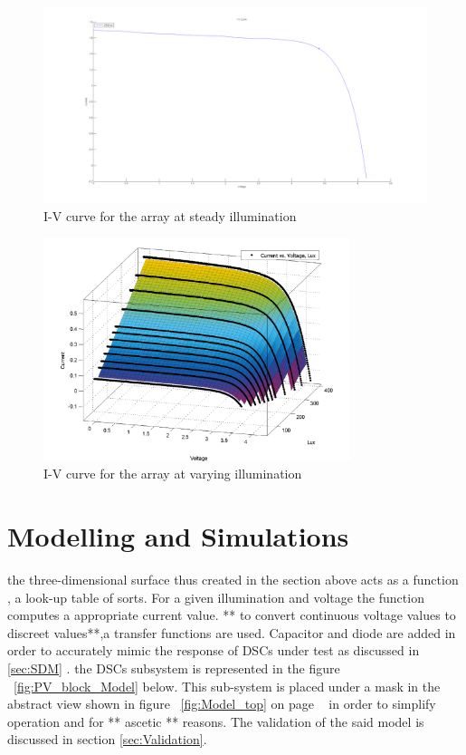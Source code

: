   \begin{figure}[H]
	  \begin{center}
		  \includegraphics[width=1.1\textwidth]{images/single2500_IV}
		  \caption{I-V curve for the array at steady illumination}
		  \label{fig:2500luxIV}
	  \end{center}
  \end{figure}
  
\begin{figure}[H]
	  \begin{center}
		  \includegraphics[width=0.8\textwidth]{images/I-V-lux}
		  \caption{I-V curve for the array at varying illumination}
		  \label{fig:luxIV100_2500}
	  \end{center}
  \end{figure}

\section{Modelling and Simulations} 

the three-dimensional surface thus created in the section above acts as a function , a look-up table of sorts. For a given illumination and voltage the function computes a appropriate current value. ** to convert continuous voltage values to discreet values**,a transfer functions are used. Capacitor and diode are added in order to accurately mimic the response of \ac{DSCs} under test as discussed in \ref{sec:SDM} . the \ac{DSCs} subsystem is represented in the figure ~\ref{fig:PV_block_Model} below. This sub-system is placed under a mask in the abstract view shown in figure ~\ref{fig:Model_top} on page ~\pageref{fig:Model_top} in order to simplify operation and for ** ascetic ** reasons. The validation of the said model is discussed in section \ref{sec:Validation}.\\

